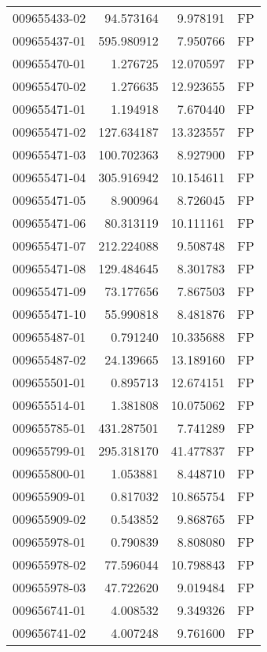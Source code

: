 \begin{tabular}{lrrl}
009655433-02 &   94.573164 &       9.978191 &   FP \\
009655437-01 &  595.980912 &       7.950766 &   FP \\
009655470-01 &    1.276725 &      12.070597 &   FP \\
009655470-02 &    1.276635 &      12.923655 &   FP \\
009655471-01 &    1.194918 &       7.670440 &   FP \\
009655471-02 &  127.634187 &      13.323557 &   FP \\
009655471-03 &  100.702363 &       8.927900 &   FP \\
009655471-04 &  305.916942 &      10.154611 &   FP \\
009655471-05 &    8.900964 &       8.726045 &   FP \\
009655471-06 &   80.313119 &      10.111161 &   FP \\
009655471-07 &  212.224088 &       9.508748 &   FP \\
009655471-08 &  129.484645 &       8.301783 &   FP \\
009655471-09 &   73.177656 &       7.867503 &   FP \\
009655471-10 &   55.990818 &       8.481876 &   FP \\
009655487-01 &    0.791240 &      10.335688 &   FP \\
009655487-02 &   24.139665 &      13.189160 &   FP \\
009655501-01 &    0.895713 &      12.674151 &   FP \\
009655514-01 &    1.381808 &      10.075062 &   FP \\
009655785-01 &  431.287501 &       7.741289 &   FP \\
009655799-01 &  295.318170 &      41.477837 &   FP \\
009655800-01 &    1.053881 &       8.448710 &   FP \\
009655909-01 &    0.817032 &      10.865754 &   FP \\
009655909-02 &    0.543852 &       9.868765 &   FP \\
009655978-01 &    0.790839 &       8.808080 &   FP \\
009655978-02 &   77.596044 &      10.798843 &   FP \\
009655978-03 &   47.722620 &       9.019484 &   FP \\
009656741-01 &    4.008532 &       9.349326 &   FP \\
009656741-02 &    4.007248 &       9.761600 &   FP \\

\end{tabular}
